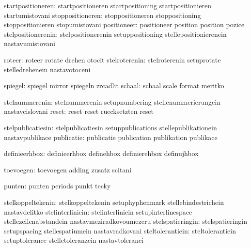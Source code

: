             startpositioneren:  startpositioneren            startpositioning
                                startpositionieren           startumistovani
             stoppositioneren:  stoppositioneren             stoppositioning
                                stoppositionieren            stopumistovani
                  positioneer:  positioneer                  position
                                position                     pozice
           stelpositionerenin:  stelpositionerenin           setuppositioning
                                stellepositionierenein       nastavumistovani

                       roteer:  roteer                       rotate
                                drehen                       otocit
                stelroterenin:  stelroterenin                setuprotate
                                stelledrehenein              nastavotoceni

                      spiegel:  spiegel                      mirror
                                spiegeln                     zrcadlit
                       schaal:  schaal                       scale
                                format                       meritko

               stelnummerenin:  stelnummerenin               setupnumbering
                                stellenummerierungein        nastavcislovani
                        reset:  reset                        reset
                                ruecksetzten                 reset

            stelpublicatiesin:  stelpublicatiesin            setuppublications
                                stellepublikationein         nastavpublikace
                   publicatie:  publicatie                   publication
                                publikation                  publikace

                definieerhbox:  definieerhbox                definehbox
                                definierehbox                definujhbox

                    toevoegen:  toevoegen                    adding
                                zusatz                       scitani

                       punten:  punten                       periods
                                punkt                        tecky

            stelkoppeltekenin:  stelkoppeltekenin            setuphyphenmark
                                stellebindestrichein         nastavdelitko
             stelinterliniein:  stelinterliniein             setupinterlinespace
                                stellezeilenabstandein       nastavmeziradkovoumezeru
             stelspatieringin:  stelspatieringin             setupspacing
                                stellespatiumein             nastavradkovani
             steltolerantiein:  steltolerantiein             setuptolerance
                                stelletoleranzein            nastavtoleranci

